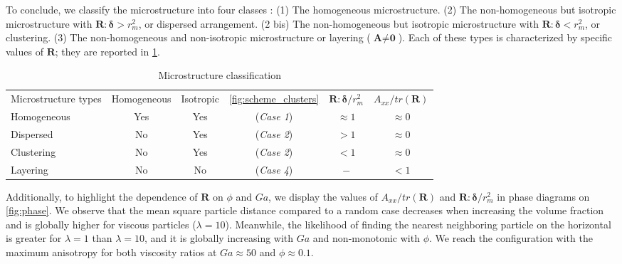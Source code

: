 \documentclass[11pt]{My_preprint}
\begin{document}
To conclude, we classify the microstructure into four classes :
(1) The homogeneous microstructure.
(2) The non-homogeneous but isotropic microstructure with $\textbf{R}:\bm\delta > r_m^2$, or dispersed arrangement. (2 bis) The non-homogeneous but isotropic microstructure with $\textbf{R}:\bm\delta < r_m^2$, or clustering. 
(3) The non-homogeneous and non-isotropic microstructure or layering ($\textbf{A}\neq \textbf{0}$). 
Each of these types is characterized by specific values of $\textbf{R}$; they are reported in \ref{tab:microstructure}. 

\begin{table}[h!]
    \caption{Microstructure classification}
    \label{tab:microstructure}
    \centering
    \begin{tabular}{|lccccc|} \hline
        Microstructure types & Homogeneous & Isotropic & \ref{fig:scheme_clusters} & $\textbf{R}:\bm\delta/r_m^2$ & $A_{xx}/tr(\textbf{R})$ \\
        Homogeneous & Yes & Yes &(\textit{Case 1}) & $ \approx 1$ & $\approx 0$ \\
        Dispersed &  No & Yes  &(\textit{Case 2}) & $ > 1$ & $\approx 0$ \\
        Clustering &  No & Yes  &(\textit{Case 2}) & $ < 1$ & $\approx 0$ \\
        Layering &    No & No  &(\textit{Case 4}) & $ - $ & $< 1$\\ \hline
    \end{tabular}
\end{table}
Additionally, to highlight the dependence of $\textbf{R}$ on $\phi$ and $Ga$, we display the values of $A_{xx}/tr(\textbf{R})$ and $\textbf{R}:\bm\delta/r_m^2$ in phase diagrams on \ref{fig:phase}.
We observe that the mean square particle distance compared to a random case decreases when increasing the volume fraction and is globally higher for viscous particles ($\lambda = 10$).
Meanwhile, the likelihood of finding the nearest neighboring particle on the horizontal is greater for $\lambda=1$ than $\lambda = 10$, and it is globally increasing with  $Ga$ and non-monotonic with $\phi$. 
We reach the configuration with the maximum anisotropy for both viscosity ratios at $Ga \approx 50$ and $\phi \approx 0.1$. 
\end{document}
